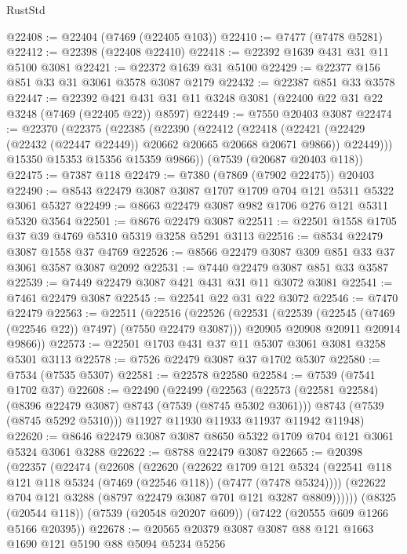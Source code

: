 \begin{lexlean}{RustStd}
\begin{coremodule}
@22408 := @22404 (@7469 (@22405 @103))
@22410 := @7477 (@7478 @5281)
@22412 := @22398 (@22408 @22410)
@22418 := @22392 @1639 @431 @31 @11 @5100 @3081
@22421 := @22372 @1639 @31 @5100
@22429 := @22377 @156 @851 @33 @31 @3061 @3578 @3087 @2179
@22432 := @22387 @851 @33 @3578
@22447 := @22392 @421 @431 @31 @11 @3248 @3081 (@22400 @22 @31 @22 @3248 (@7469 (@22405 @22)) @8597)
@22449 := @7550 @20403 @3087
@22474 := @22370
    (@22375
      (@22385
        (@22390
          (@22412
            (@22418
              (@22421 (@22429 (@22432 (@22447 @22449)) @20662 @20665 @20668 @20671 @9866))
              @22449)))
        @15350
        @15353
        @15356
        @15359
        @9866))
    (@7539 (@20687 @20403 @118))
@22475 := @7387 @118
@22479 := @7380 (@7869 (@7902 @22475)) @20403
@22490 := @8543 @22479 @3087 @3087 @1707 @1709 @704 @121 @5311 @5322 @3061 @5327
@22499 := @8663 @22479 @3087 @982 @1706 @276 @121 @5311 @5320 @3564
@22501 := @8676 @22479 @3087
@22511 := @22501 @1558 @1705 @37 @39 @4769 @5310 @5319 @3258 @5291 @3113
@22516 := @8534 @22479 @3087 @1558 @37 @4769
@22526 := @8566 @22479 @3087 @309 @851 @33 @37 @3061 @3587 @3087 @2092
@22531 := @7440 @22479 @3087 @851 @33 @3587
@22539 := @7449 @22479 @3087 @421 @431 @31 @11 @3072 @3081
@22541 := @7461 @22479 @3087
@22545 := @22541 @22 @31 @22 @3072
@22546 := @7470 @22479
@22563 := @22511
    (@22516
      (@22526
        (@22531 (@22539 (@22545 (@7469 (@22546 @22)) @7497) (@7550 @22479 @3087)))
        @20905
        @20908
        @20911
        @20914
        @9866))
@22573 := @22501 @1703 @431 @37 @11 @5307 @3061 @3081 @3258 @5301 @3113
@22578 := @7526 @22479 @3087 @37 @1702 @5307
@22580 := @7534 (@7535 @5307)
@22581 := @22578 @22580
@22584 := @7539 (@7541 @1702 @37)
@22608 := @22490
    (@22499
      (@22563
        (@22573 (@22581 @22584) (@8396 @22479 @3087) @8743 (@7539 (@8745 @5302 @3061)))
        @8743
        (@7539 (@8745 @5292 @5310)))
      @11927
      @11930
      @11933
      @11937
      @11942
      @11948)
@22620 := @8646 @22479 @3087 @3087 @8650 @5322 @1709 @704 @121 @3061 @5324 @3061 @3288
@22622 := @8788 @22479 @3087
@22665 := @20398
    (@22357
      (@22474
        (@22608
          (@22620
            (@22622
              @1709
              @121
              @5324
              (@22541 @118 @121 @118 @5324 (@7469 (@22546 @118)) (@7477 (@7478 @5324))))
            (@22622 @704 @121 @3288 (@8797 @22479 @3087 @701 @121 @3287 @8809))))))
    (@8325 (@20544 @118))
    (@7539 (@20548 @20207 @609))
    (@7422 (@20555 @609 @1266 @5166 @20395))
@22678 := @20565 @20379 @3087 @3087 @88 @121 @1663 @1690 @121 @5190 @88 @5094 @5234 @5256

\end{coremodule}
\end{lexlean}
